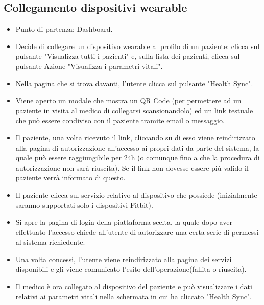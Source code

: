 \documentclass[12pt,a4paper,oneside]{report}
\begin{document}
\subsection{Collegamento dispositivi wearable}
\begin{itemize}
  \item Punto di partenza: Dashboard.
    \item Decide di collegare un dispositivo wearable al profilo di un paziente: clicca sul pulsante "Visualizza tutti i pazienti" e, sulla lista dei pazienti, clicca sul pulsante Azione "Visualizza i parametri vitali".
    \item Nella pagina che si trova davanti, l'utente clicca sul pulsante "Health Sync".
    \item Viene aperto un modale che mostra un QR Code (per permettere ad un paziente in visita al medico di collegarsi scansionandolo) ed un link testuale che può essere condiviso con il paziente tramite email o messaggio.
    \item Il paziente, una volta ricevuto il link, cliccando su di esso viene reindirizzato alla pagina di autorizzazione all'accesso ai propri dati da parte del sistema, la quale può essere raggiungibile per 24h (o comunque fino a che la procedura di autorizzazione non sarà riuscita). Se il link non dovesse essere più valido il paziente verrà informato di questo.
  \item Il paziente clicca sul servizio relativo al dispositivo che possiede (inizialmente saranno supportati solo i dispositivi Fitbit).
    \item Si apre la pagina di login della piattaforma scelta, la quale dopo aver effettuato l'accesso chiede all'utente di autorizzare una certa serie di permessi al sistema richiedente.
    \item Una volta concessi, l'utente viene reindirizzato alla pagina dei servizi disponibili e gli viene comunicato l'esito dell'operazione(fallita o riuscita).
    \item Il medico è ora collegato al dispositivo del paziente e può visualizzare i dati relativi ai parametri vitali nella schermata in cui ha cliccato "Health Sync".
\end{itemize}
\end{document}
